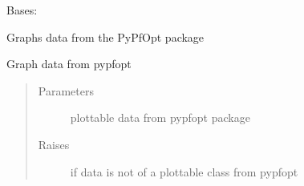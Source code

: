 \documentclass[letterpaper,10pt,english]{sphinxmanual}
\begin{document}
\begin{fulllineitems}
\label{\detokenize{dalio.external:dalio.external.image.PyPfOptGraph}}
Bases: {\hyperref[\detokenize{dalio.external:dalio.external.image.PyPlotGraph}]{}}

Graphs data from the PyPfOpt package

\begin{fulllineitems}
\label{\detokenize{dalio.external:dalio.external.image.PyPfOptGraph.plot}}
Graph data from pypfopt
\begin{quote}\begin{description}
\item[{Parameters}] \leavevmode
{} \textendash{} plottable data from pypfopt package

\item[{Raises}] \leavevmode
{} \textendash{} if data is not of a plottable class from pypfopt

\end{description}\end{quote}

\end{fulllineitems}


\end{fulllineitems}

\end{document}
